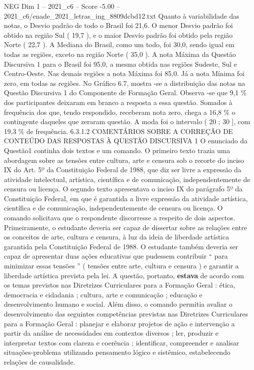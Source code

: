 \begin{textsample}{NEG Dim 1 – 2021\_c6 – Score -5.00 – 2021\_c6/enade\_2021\_letras\_ing\_8809dcbd12.txt}
Quanto à variabilidade das notas, o Desvio padrão de todo o Brasil foi 21,6.
O menor Desvio padrão foi obtido na região Sul ( 19,7 ), e o maior Desvio padrão foi obtido pela região Norte ( 22,7 ).
A Mediana do Brasil, como um todo, foi 30,0, sendo igual em todas as regiões, exceto na região Norte ( 35,0 ).
A nota Máxima da Questão Discursiva 1 para o Brasil foi 95,0, a mesma obtida nas regiões Sudeste, Sul e Centro-Oeste.
Nas demais regiões a nota Máxima foi 85,0.
Já a nota Mínima foi zero, em todas as regiões.
No Gráfico 6.7, mostra -se a distribuição das notas na Questão Discursiva 1 do Componente de Formação Geral.
Observa -se que 9,1 \% dos participantes deixaram em branco a resposta a essa questão.
Somados à frequência dos que, tendo respondido, receberam nota zero, chega a 16,8 \% o contingente daqueles que zeraram questão.
A moda foi o intervalo ( 20 ; 30 ], com 19,3 \% de frequência. 6.3.1.2 COMENTÁRIOS SOBRE A CORREÇÃO DE CONTEÚDO DAS RESPOSTAS À QUESTÃO DISCURSIVA 1 O enunciado da Questão1 continha dois textos e um comando.
O primeiro texto trazia uma abordagem sobre as tensões entre cultura, arte e censura sob o recorte do inciso IX do Art. 5º da Constituição Federal de 1988, que diz ser livre a expressão da atividade intelectual, artística, científica e de comunicação, independentemente de censura ou licença.
O segundo texto apresentava o inciso IX do parágrafo 5º da Constituição Federal, em que é garantida a livre expressão da atividade artística, científica e de comunicação, independentemente de censura ou licença.
O comando solicitava que o respondente discorresse a respeito de dois aspectos.
Primeiramente, o estudante deveria ser capaz de dissertar sobre as relações entre os conceitos de arte, cultura e censura, à luz da ideia de liberdade artística garantida pela Constituição Federal de 1988.
O estudante também deveria ser capaz de apresentar duas ações educativas que pudessem contribuir “ para minimizar essas tensões ” ( tensões entre arte, cultura e censura ) e garantir a liberdade artística prevista pela lei.
A questão, portanto, \textbf{estava} de acordo com os temas previstos nas Diretrizes Curriculares para a Formação Geral : ética, democracia e cidadania ; cultura, arte e comunicação ; educação e desenvolvimento humano e social.
Além disso, o comando permitia avaliar o desenvolvimento das seguintes competências previstas nas Diretrizes Curriculares para a Formação Geral : planejar e elaborar projetos de ação e intervenção a partir da análise de necessidades em contextos diversos ; ler, produzir e interpretar textos com clareza e coerência ; identificar, compreender e analisar situações-problema utilizando pensamento lógico e sistêmico, estabelecendo relações de causalidade.

\end{textsample}
